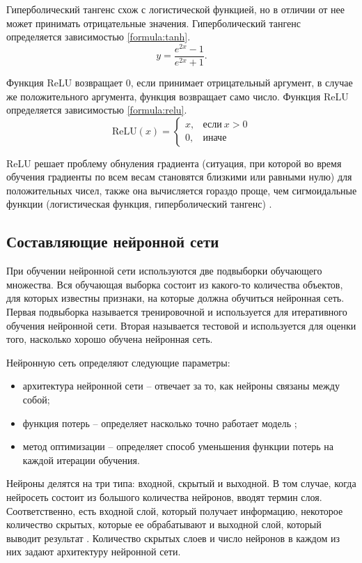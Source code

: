 Гиперболический тангенс схож с логистической функцией, но в отличии от нее может принимать отрицательные значения. Гиперболический тангенс определяется зависимостью \ref{formula:tanh}.
\begin{equation}\label{formula:tanh}
y = \frac{e^{2x} - 1}{e^{2x} + 1}.
\end{equation}

Функция ReLU возвращает 0, если принимает отрицательный аргумент, в случае же положительного аргумента, функция возвращает само число. Функция ReLU определяется зависимостью \ref{formula:relu}.
\begin{equation}\label{formula:relu}
\mathrm{ReLU}(x)=\begin{cases}
x, & \text{если}\ x>0 \\
0, & \text{иначе}
\end{cases}
\end{equation} 

ReLU решает проблему обнуления градиента (ситуация, при которой во время обучения градиенты по всем весам становятся близкими или равными нулю) для положительных чисел, также она вычисляется гораздо проще, чем сигмоидальные функции (логистическая функция, гиперболический тангенс) \cite{activation_function}.

\subsection{Составляющие нейронной сети}
При обучении нейронной сети используются две подвыборки обучающего множества. Вся обучающая выборка состоит из какого-то количества объектов, для которых известны признаки, на которые должна обучиться нейронная сеть. Первая подвыборка называется тренировочной и используется для итеративного обучения нейронной сети. Вторая называется тестовой и используется для оценки того, насколько хорошо обучена нейронная сеть.

Нейронную сеть определяют следующие параметры:
\begin{itemize}
	\item архитектура нейронной сети -- отвечает за то, как нейроны связаны между собой;
	\item функция потерь -- определяет насколько точно работает модель \cite{neuro_base};
	\item метод оптимизации -- определяет способ уменьшения функции потерь на каждой итерации обучения.
\end{itemize}

Нейроны делятся на три типа: входной, скрытый и выходной. В том случае, когда нейросеть состоит из большого количества нейронов, вводят термин слоя. Соответственно, есть входной слой, который получает информацию, некоторое количество скрытых, которые ее обрабатывают и выходной слой, который выводит результат \cite{neuro_architecture}. Количество скрытых слоев и число нейронов в каждом из них задают архитектуру нейронной сети.

